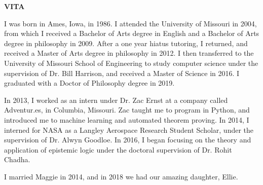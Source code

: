\newpage
{}

\centerline{\bf \large VITA}
\vskip 10mm %

I was born in Ames, Iowa, in 1986. I attended the University of Missouri in 2004, from which I received a Bachelor of Arts degree in English and a Bachelor of Arts degree in philosophy in 2009. After a one year hiatus tutoring, I returned, and received a Master of Arts degree in philosophy in 2012. I then transferred to the University of Missouri School of Engineering to study computer science under the supervision of Dr. Bill Harrison, and received a Master of Science in 2016. I graduated with a Doctor of Philosophy degree in 2019.

In 2013, I worked as an intern under Dr. Zac Ernst at a company called Adventur.es, in Columbia, Missouri. Zac taught me to program in Python, and introduced me to machine learning and automated theorem proving. In 2014, I interned for NASA as a Langley Aerospace Research Student Scholar, under the supervision of Dr. Alwyn Goodloe. In 2016, I began focusing on the theory and application of epistemic logic under the doctoral supervision of Dr. Rohit Chadha.

I married Maggie in 2014, and in 2018 we had our amazing daughter, Ellie.
